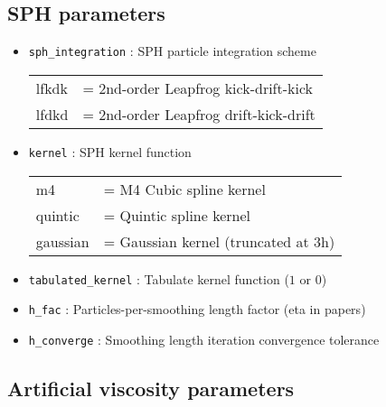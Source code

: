 \documentclass[a4paper]{article}
\newcommand{\var}[1]{\texttt{#1}}
\begin{document}
\subsection{SPH parameters}

\begin{itemize}

\item \var{sph\_integration} : SPH particle integration scheme \\
\begin{tabular}{ll}
lfkdk   & = 2nd-order Leapfrog kick-drift-kick \\
lfdkd   & = 2nd-order Leapfrog drift-kick-drift
\end{tabular}

\item \var{kernel} : SPH kernel function \\
\begin{tabular}{ll}
m4        & = M4 Cubic spline kernel \\
quintic   & = Quintic spline kernel \\
gaussian  & = Gaussian kernel (truncated at 3h)
\end{tabular}

\item \var{tabulated\_kernel} : Tabulate kernel function  ($1$ or $0$)

\item \var{h\_fac} : Particles-per-smoothing length factor (eta in papers)

\item \var{h\_converge} : Smoothing length iteration convergence tolerance

\end{itemize}





\subsection{Artificial viscosity parameters}
\end{document}
